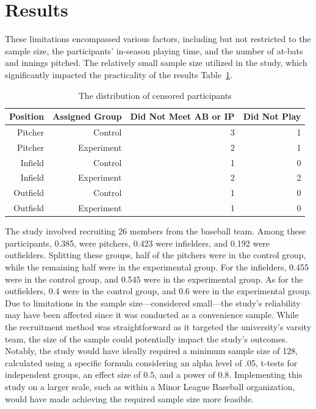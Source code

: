 \documentclass[12pt]{article}
\begin{document}
\section{Results}
\label{sec:resu}
These limitations encompassed various factors, including but not restricted to the sample size, the participants' in-season playing time,
and the number of at-bats and innings pitched. The relatively small sample size utilized in the study, which significantly impacted the practicality of the results Table~\ref{tab:rv}.

\begin{table}[tbp]
  \caption{The distribution of censored participants}
  \label{tab:rv}
\centering
\begin{tabular}{rrrr}
  \toprule
  Position & Assigned Group & Did Not Meet AB or IP & Did Not Play\\ 
  \midrule
Pitcher & Control & 3 & 1\\
Pitcher & Experiment & 2 & 1\\
Infield & Control & 1 & 0 \\
Infield & Experiment & 2 & 2\\
Outfield & Control & 1 & 0\\
Outfield & Experiment & 1 & 0\\
  \bottomrule
\end{tabular}
\end{table}

The study involved recruiting 26 members from the baseball team. Among these participants, 0.385, were pitchers, 0.423 were infielders, and 0.192 were outfielders. 
Splitting these groups, half of the pitchers were in the control group, while the remaining half were in the experimental group. For the infielders, 
0.455 were in the control group, and 0.545 were in the experimental group. As for the outfielders, 0.4 were in the control group, and 0.6 were in the experimental group.
Due to limitations in the sample size—considered small—the study's reliability may have been affected since it was conducted as a convenience sample. 
While the recruitment method was straightforward as it targeted the university's varsity team, the size of the sample could potentially impact the study's outcomes. 
Notably, the study would have ideally required a minimum sample size of 128, calculated using a specific formula considering an alpha level of .05, t-tests for independent groups, 
an effect size of 0.5, and a power of 0.8. Implementing this study on a larger scale, such as within a Minor League Baseball organization, 
would have made achieving the required sample size more feasible. 




\end{document}
